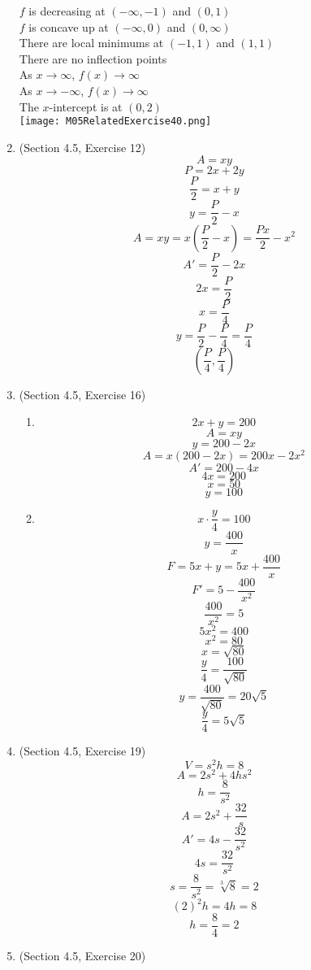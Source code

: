 \documentclass{article}
\begin{document}
\begin{enumerate}
        $f$ is decreasing at $(-\infty, -1)$ and $(0, 1)$ \\
        $f$ is concave up at $(-\infty, 0)$ and $(0, \infty)$ \\
        There are local minimums at $(-1, 1)$ and $(1, 1)$ \\
        There are no inflection points \\
        As $x \to \infty$, $f(x) \to \infty$ \\
        As $x \to -\infty$, $f(x) \to \infty$ \\
        The $x$-intercept is at $(0, 2)$ \\
        \texttt{[image: M05RelatedExercise40.png]}
    \item (Section 4.5, Exercise 12)
        $$A = xy$$
        $$P = 2x + 2y$$
        $$\frac{P}{2} = x + y$$
        $$y = \frac{P}{2} - x$$
        $$A = xy = x\left(\frac{P}{2} - x\right) = \frac{Px}{2} - x^2$$
        $$A' = \frac{P}{2} - 2x$$
        $$2x = \frac{P}{2}$$
        $$x = \frac{P}{4}$$
        $$y = \frac{P}{2} - \frac{P}{4} = \frac{P}{4}$$
        $$\left(\frac{P}{4}, \frac{P}{4}\right)$$
    \item (Section 4.5, Exercise 16)
        \begin{enumerate}
            \item
            $$2x + y = 200$$
            $$A = xy$$
            $$y = 200 - 2x$$
            $$A = x\left(200 - 2x\right) = 200x - 2x^2$$
            $$A' = 200 - 4x$$
            $$4x = 200$$
            $$x = 50$$
            $$y = 100$$
            \item
            $$x\cdot\frac{y}{4} = 100$$
            $$y = \frac{400}{x}$$
            $$F = 5x + y = 5x + \frac{400}{x}$$
            $$F' = 5 - \frac{400}{x^2}$$
            $$\frac{400}{x^2} = 5$$
            $$5x^2 = 400$$
            $$x^2 = 80$$
            $$x = \sqrt{80}$$
            $$\frac{y}{4} = \frac{100}{\sqrt{80}}$$
            $$y = \frac{400}{\sqrt{80}} = 20\sqrt{5}$$
            $$\frac{y}{4} = 5\sqrt{5}$$
        \end{enumerate}
    \item (Section 4.5, Exercise 19)
        $$V = s^2h = 8$$
        $$A = 2s^2 + 4hs^2$$
        $$h = \frac{8}{s^2}$$
        $$A = 2s^2 + \frac{32}{s}$$
        $$A' = 4s - \frac{32}{s^2}$$
        $$4s = \frac{32}{s^2}$$
        $$s = \frac{8}{s^2} = \sqrt[3]{8} = 2$$
        $$\left(2\right)^2h = 4h = 8$$
        $$h = \frac{8}{4} = 2$$
    \item (Section 4.5, Exercise 20)

\end{enumerate}
\end{document}
